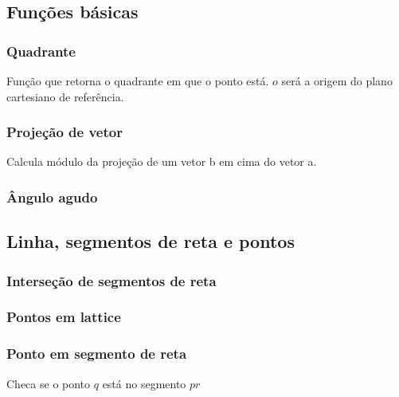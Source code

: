 
\subsection{Fun\c{c}\~{o}es b\'{a}sicas}
\subsubsection{Quadrante}
Fun\c{c}\~{a}o que retorna o quadrante em que o ponto est\'{a}. $o$ ser\'{a} a origem do plano cartesiano de refer\^{e}ncia.
\divisor

\subsubsection{Proje\c{c}\~{a}o de vetor}
Calcula m\'{o}dulo da proje\c{c}\~{a}o de um vetor b em cima do vetor a.
\divisor

\subsubsection{\^{A}ngulo agudo}


\subsection{Linha, segmentos de reta e pontos}

\subsubsection{Interse\c{c}\~{a}o de segmentos de reta}
\divisor

\subsubsection{Pontos em lattice}
\divisor

\subsubsection{Ponto em segmento de reta}
Checa se o ponto $q$ est\'{a} no segmento $pr$
\divisor

